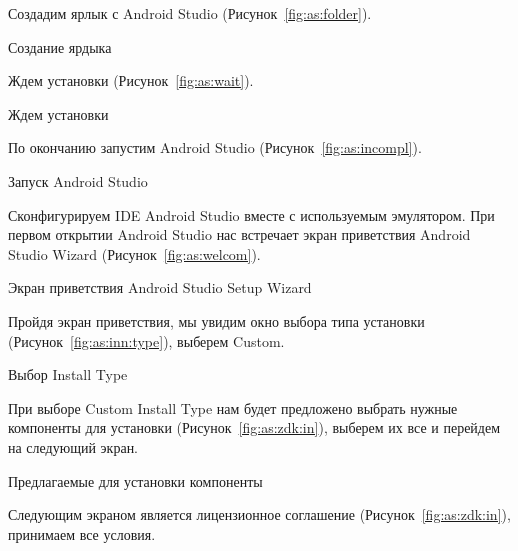 Создадим ярлык с Android Studio (Рисунок~\ref{fig:as:folder}).

\begin{image}
	\caption{Создание ярдыка}
	\label{fig:as:folder}
\end{image}

\clearpage

Ждем установки (Рисунок~\ref{fig:as:wait}).

\begin{image}
	\caption{Ждем установки}
	\label{fig:as:wait}
\end{image}

По окончанию запустим Android Studio (Рисунок~\ref{fig:as:incompl}).

\begin{image}
	\caption{Запуск Android Studio}
	\label{fig:as:incompl}
\end{image}


\clearpage

Сконфигурируем IDE Android Studio вместе с используемым эмулятором.
При первом открытии Android Studio нас встречает экран приветствия Android Studio Wizard (Рисунок~\ref{fig:as:welcom}).

\begin{image}
	\caption{Экран приветствия Android Studio Setup Wizard}
	\label{fig:as:welcom}
\end{image}

Пройдя экран приветствия, мы увидим окно выбора типа установки (Рисунок~\ref{fig:as:inn:type}), выберем Custom.

\begin{image}
	\caption{Выбор Install Type}
	\label{fig:as:inn:type}
\end{image}

При выборе Custom Install Type нам будет предложено выбрать нужные компоненты для установки
(Рисунок~\ref{fig:as:zdk:in}), выберем их все и перейдем на следующий экран.

\begin{image}
	\caption{Предлагаемые для установки компоненты}
	\label{fig:as:zdk:in}
\end{image}

Следующим экраном является лицензионное соглашение (Рисунок~\ref{fig:as:zdk:in}), принимаем все условия.

